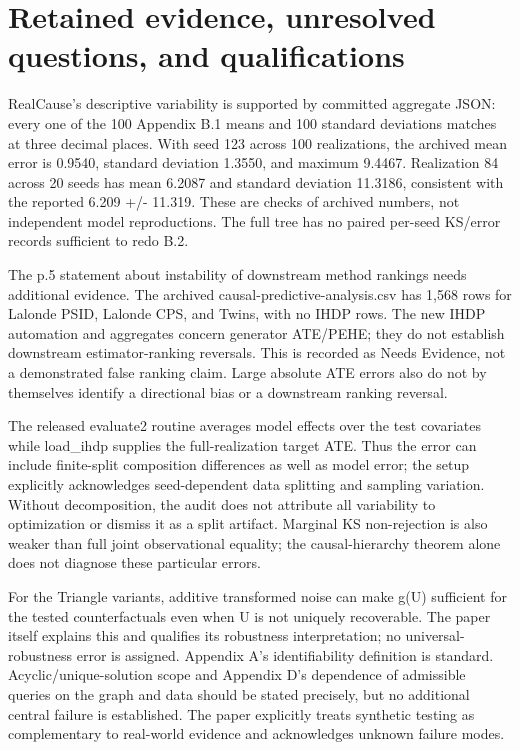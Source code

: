 \documentclass[10pt]{article}
\begin{document}
\section*{Retained evidence, unresolved questions, and qualifications}
RealCause’s descriptive variability is supported by committed aggregate JSON: every one of the 100 Appendix B.1 means and 100 standard deviations matches at three decimal places. With seed 123 across 100 realizations, the archived mean error is 0.9540, standard deviation 1.3550, and maximum 9.4467. Realization 84 across 20 seeds has mean 6.2087 and standard deviation 11.3186, consistent with the reported 6.209 +/- 11.319. These are checks of archived numbers, not independent model reproductions. The full tree has no paired per-seed KS/error records sufficient to redo B.2.\par
The p.5 statement about instability of downstream method rankings needs additional evidence. The archived causal-predictive-analysis.csv has 1,568 rows for Lalonde PSID, Lalonde CPS, and Twins, with no IHDP rows. The new IHDP automation and aggregates concern generator ATE/PEHE; they do not establish downstream estimator-ranking reversals. This is recorded as Needs Evidence, not a demonstrated false ranking claim. Large absolute ATE errors also do not by themselves identify a directional bias or a downstream ranking reversal.\par
The released evaluate2 routine averages model effects over the test covariates while load\_ihdp supplies the full-realization target ATE. Thus the error can include finite-split composition differences as well as model error; the setup explicitly acknowledges seed-dependent data splitting and sampling variation. Without decomposition, the audit does not attribute all variability to optimization or dismiss it as a split artifact. Marginal KS non-rejection is also weaker than full joint observational equality; the causal-hierarchy theorem alone does not diagnose these particular errors.\par
For the Triangle variants, additive transformed noise can make g(U) sufficient for the tested counterfactuals even when U is not uniquely recoverable. The paper itself explains this and qualifies its robustness interpretation; no universal-robustness error is assigned. Appendix A’s identifiability definition is standard. Acyclic/unique-solution scope and Appendix D’s dependence of admissible queries on the graph and data should be stated precisely, but no additional central failure is established. The paper explicitly treats synthetic testing as complementary to real-world evidence and acknowledges unknown failure modes.\par
\end{document}
